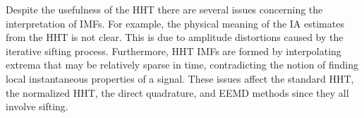 \documentclass[11pt,draftcls,onecolumn]{IEEEtran}
\begin{document}
Despite the usefulness of the HHT there are several issues concerning the interpretation of IMFs. For example, the physical meaning of the IA estimates from the HHT is not clear. This is due to amplitude distortions caused by the iterative sifting process. Furthermore, HHT IMFs are formed by interpolating extrema that may be relatively sparse in time, contradicting the notion of finding local instantaneous properties of a signal. These issues affect the standard HHT, the normalized HHT, the direct quadrature, and EEMD methods since they all involve sifting. 

% 
\end{document}
